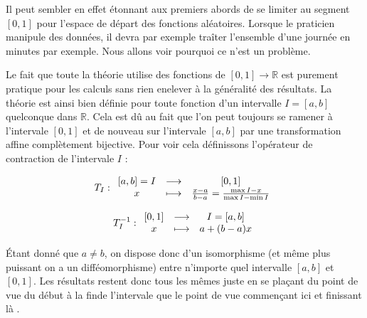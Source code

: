
Il peut sembler en effet étonnant aux premiers abords de se limiter au segment $[0,1]$ pour l'espace de départ des fonctions aléatoires. Lorsque le praticien manipule des données, il devra par exemple traîter l'ensemble d'une journée en minutes par exemple. Nous allons voir pourquoi ce n'est un problème.

Le fait que toute la théorie utilise des fonctions de $[0,1] \rightarrow \mathds R$ est purement pratique pour les calculs sans rien enelever à la généralité des résultats. La théorie est ainsi bien définie pour toute fonction d'un intervalle $I = [a,b]$ quelconque dans $\mathds R$. Cela est dû au fait que l'on peut toujours se ramener à l'intervale $[0,1]$ et de nouveau sur l'intervale $[a,b]$ par une transformation affine complètement bijective. Pour voir cela définissons l'opérateur de contraction de l'intervale $I$ :

\begin{equation}
	T_I :
	\begin{array}{ccc} [a,b]=I &\longrightarrow& [0,1] \\ x &\longmapsto& \frac{x - a}{b-a} = \frac{\max I - x}{\max I - \min I} \end{array}
\end{equation}

\begin{equation}
	T^{-1}_I : \begin{array}{ccc} [0,1] &\longrightarrow& I = [a,b] \\ x &\longmapsto& a + (b-a)x \end{array}
\end{equation}

Étant donné que $a \neq b$, on dispose donc d'un isomorphisme (et même plus puissant on a un difféomorphisme) entre n'importe quel intervalle $[a,b]$ et $[0,1]$. Les résultats restent donc tous les mêmes juste en se plaçant du point de vue \og du début à la fin\fg de l'intervale que le point de vue \og commençant ici et finissant là \fg.
